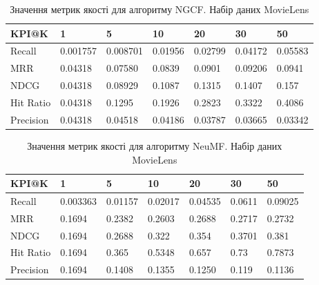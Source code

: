 \begin{table}
    \begin{tabular}{|l|l|l|l|l|l|l|}
        \hline
        KPI@K     & 1        & 5        & 10      & 20      & 30      & 50      \\ \hline
        Recall    & 0.001757 & 0.008701 & 0.01956 & 0.02799 & 0.04172 & 0.05583 \\ \hline
        MRR       & 0.04318  & 0.07580  & 0.0839  & 0.0901  & 0.09206 & 0.0941  \\ \hline
        NDCG      & 0.04318  & 0.08929  & 0.1087  & 0.1315  & 0.1407  & 0.157   \\ \hline
        Hit Ratio & 0.04318  & 0.1295   & 0.1926  & 0.2823  & 0.3322  & 0.4086  \\ \hline
        Precision & 0.04318  & 0.04518  & 0.04186 & 0.03787 & 0.03665 & 0.03342 \\ \hline
    \end{tabular}
    \caption{Значення метрик якості для алгоритму NGCF. Набір даних MovieLens}
\end{table}
\begin{table}
    \begin{tabular}{|l|l|l|l|l|l|l|}
        \hline
        KPI@K     & 1        & 5       & 10      & 20      & 30     & 50      \\ \hline
        Recall    & 0.003363 & 0.01157 & 0.02017 & 0.04535 & 0.0611 & 0.09025 \\ \hline
        MRR       & 0.1694   & 0.2382  & 0.2603  & 0.2688  & 0.2717 & 0.2732  \\ \hline
        NDCG      & 0.1694   & 0.2688  & 0.322   & 0.354   & 0.3701 & 0.381   \\ \hline
        Hit Ratio & 0.1694   & 0.365   & 0.5348  & 0.657   & 0.73   & 0.7873  \\ \hline
        Precision & 0.1694   & 0.1408  & 0.1355  & 0.1250  & 0.119  & 0.1136  \\ \hline
    \end{tabular}
    \caption{Значення метрик якості для алгоритму NeuMF. Набір даних MovieLens}
\end{table}

